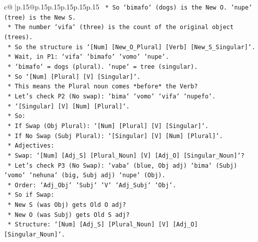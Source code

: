 \documentclass{article}
\begin{document}
{\begin{supertabular}{c@{$\;$}|p{.15\linewidth}@{}p{.15\linewidth}p{.15\linewidth}p{.15\linewidth}p{.15\linewidth}p{.15\linewidth}}
{{{\texttt{                *   So `bimafo` (dogs) is the New O. `nupe` (tree) is the New S.} \\
\texttt{                *   The number `vifa` (three) is the count of the original object (trees).} \\
\texttt{                *   So the structure is `{[}Num{]} {[}New\_O\_Plural{]} {[}Verb{]} {[}New\_S\_Singular{]}`.} \\
\texttt{                *   Wait, in P1: `vifa` `bimafo` `vomo` `nupe`.} \\
\texttt{                *   `bimafo` = dogs (plural). `nupe` = tree (singular).} \\
\texttt{                *   So `{[}Num{]} {[}Plural{]} {[}V{]} {[}Singular{]}`.} \\
\texttt{                *   This means the Plural noun comes *before* the Verb?} \\
\texttt{                *   Let's check P2 (No swap): `bima` `vomo` `vifa` `nupefo`.} \\
\texttt{                *   `{[}Singular{]} {[}V{]} {[}Num{]} {[}Plural{]}`.} \\
\texttt{                *   So:} \\
\texttt{                    *   If Swap (Obj Plural): `{[}Num{]} {[}Plural{]} {[}V{]} {[}Singular{]}`.} \\
\texttt{                    *   If No Swap (Subj Plural): `{[}Singular{]} {[}V{]} {[}Num{]} {[}Plural{]}`.} \\
\texttt{                *   Adjectives:} \\
\texttt{                    *   Swap: `{[}Num{]} {[}Adj\_S{]} {[}Plural\_Noun{]} {[}V{]} {[}Adj\_O{]} {[}Singular\_Noun{]}`?} \\
\texttt{                    *   Let's check P3 (No Swap): `vaba` (blue, Obj adj) `bima` (Subj) `vomo` `nehuna` (big, Subj adj) `nupe` (Obj).} \\
\texttt{                    *   Order: `Adj\_Obj` `Subj` `V` `Adj\_Subj` `Obj`.} \\
\texttt{                    *   So if Swap:} \\
\texttt{                        *   New S (was Obj) gets Old O adj?} \\
\texttt{                        *   New O (was Subj) gets Old S adj?} \\
\texttt{                        *   Structure: `{[}Num{]} {[}Adj\_S{]} {[}Plural\_Noun{]} {[}V{]} {[}Adj\_O{]} {[}Singular\_Noun{]}`.} \\
}}}
\end{supertabular}}
\end{document}
